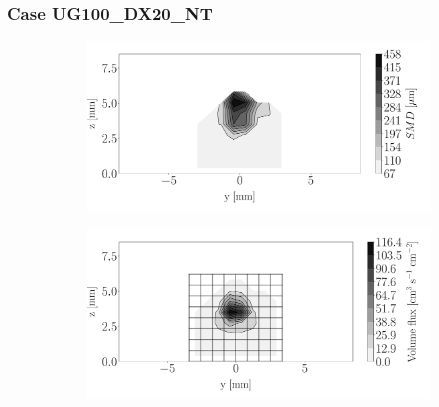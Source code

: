 

\clearpage

\subsubsection*{Case UG100\_DX20\_NT}





\begin{figure}[h!]
\centering
\begin{subfigure}[b]{0.3\textwidth}
	\centering
   \includegraphics[scale=\scaleSLIJICF]{./part2_developments/figures_ch5_resolved_JICF/injectors_SLI/uG100_dx20_x05_NT_SMD_map}
\end{subfigure}
   \hspace{0.17in}
\begin{subfigure}[b]{0.3\textwidth}
	\centering
   \includegraphics[scale=\scaleSLIJICF]{./part2_developments/figures_ch5_resolved_JICF/injectors_SLI/uG100_dx20_x05_NT_volume_flux_map}

\end{subfigure}
\end{figure}
